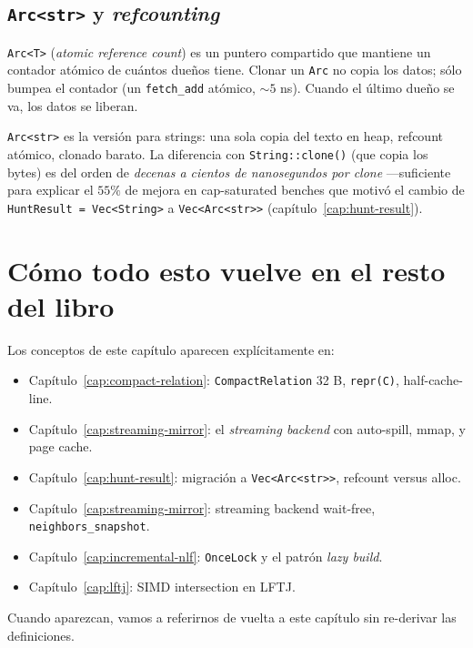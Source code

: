 \subsection{\texttt{Arc<str>} y \emph{refcounting}}

\texttt{Arc<T>} (\emph{atomic reference count}) es un puntero
compartido que mantiene un contador atómico de cuántos dueños
tiene. Clonar un \texttt{Arc} no copia los datos; sólo bumpea el
contador (un \texttt{fetch\_add} atómico, \(\sim 5\) ns). Cuando el
último dueño se va, los datos se liberan.

\texttt{Arc<str>} es la versión para strings: una sola copia del
texto en heap, refcount atómico, clonado barato. La diferencia
con \texttt{String::clone()} (que copia los bytes) es del orden de
\emph{decenas a cientos de nanosegundos por clone} ---suficiente para
explicar el \(55\%\) de mejora en cap-saturated benches que motivó
el cambio de \texttt{HuntResult = Vec<String>} a
\texttt{Vec<Arc<str>>} (capítulo~\ref{cap:hunt-result}).

\section{Cómo todo esto vuelve en el resto del libro}

Los conceptos de este capítulo aparecen explícitamente en:

\begin{itemize}
    \item Capítulo~\ref{cap:compact-relation}: \texttt{CompactRelation}
    32 B, \texttt{repr(C)}, half-cache-line.
    \item Capítulo~\ref{cap:streaming-mirror}: el \emph{streaming
    backend} con auto-spill, mmap, y page cache.
    \item Capítulo~\ref{cap:hunt-result}: migración a
    \texttt{Vec<Arc<str>>}, refcount versus alloc.
    \item Capítulo~\ref{cap:streaming-mirror}: streaming backend
    wait-free, \texttt{neighbors\_snapshot}.
    \item Capítulo~\ref{cap:incremental-nlf}: \texttt{OnceLock} y
    el patrón \emph{lazy build}.
    \item Capítulo~\ref{cap:lftj}: SIMD intersection en LFTJ.
\end{itemize}

\noindent
Cuando aparezcan, vamos a referirnos de vuelta a este capítulo
sin re-derivar las definiciones.

